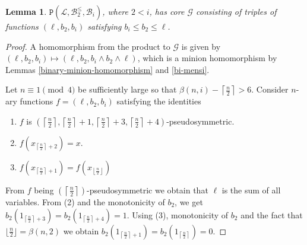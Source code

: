 \documentclass{amsart}
\numberwithin{equation}{section}
\theoremstyle{plain}
\newtheorem{lemma}[theorem]{Lemma}
\theoremstyle{definition}
\def\clone#1{\mathcal{#1}}
\def\minion#1{\mathcal{#1}}
\def\Bc{\clone{B}}
\def\Lc{\clone{L}}
\def\C#1{{\mathtt{P}}(#1)}
\begin{document}
\begin{lemma}\label{lb2leqbi} $\C{\Lc,\Bc_2^\leq, \Bc_i}$, where $2<i$, has core $\minion{G}$ consisting of triples of functions $(\ell,b_2,b_i)$ satisfying $b_i \leq b_2 \leq \ell$.
\end{lemma}
\begin{proof}
  A homomorphism from the product to $\minion{G}$ is given by $(\ell, b_2, b_i)\mapsto (\ell, b_2, b_i\wedge b_2\wedge \ell)$, which is a minion homomorphism
by Lemmas \ref{binary-minion-homomorphism} and \ref{bi-mensi}.

Let $n\equiv 1\pmod 4$ be sufficiently large so that $\beta(n,i)-\left\lceil\frac{n}{2}\right\rceil > 6$. 
Consider $n$-ary functions $f = (\ell,b_2,b_i)$ satisfying the identities
\begin{enumerate}
    \item $f$ is $(\left\lceil\frac{n}{2}\right\rceil, \left\lceil\frac{n}{2}\right\rceil+1, \left\lceil\frac{n}{2}\right\rceil+3, \left\lceil\frac{n}{2}\right\rceil+4)$-pseudosymmetric.
    \item $f(x_{\left\lceil\frac{n}{2}\right\rceil+2}) = x$.
    \item $f(x_{\left\lceil\frac{n}{2}\right\rceil+1}) = f(x_{\left\lfloor\frac{n}{2}\right\rfloor})$
\end{enumerate}

From $f$ being $(\left\lceil\frac{n}{2}\right\rceil)$-pseudosymmetric we obtain that $\ell$ is the sum of all variables. From (2) and the monotonicity of $b_2$, we get $b_2(1_{\left\lceil\frac{n}{2}\right\rceil +3}) = b_2(1_{\left\lceil\frac{n}{2}\right\rceil +4}) = 1$. Using (3), monotonicity of $b_2$ and the fact that $\lfloor \frac{n}{2}\rfloor = \beta(n,2)$ we obtain $b_2(1_{\left\lceil\frac{n}{2}\right\rceil +1}) = b_2(1_{\left\lceil\frac{n}{2}\right\rceil}) = 0$.


\end{proof}
\end{document}
